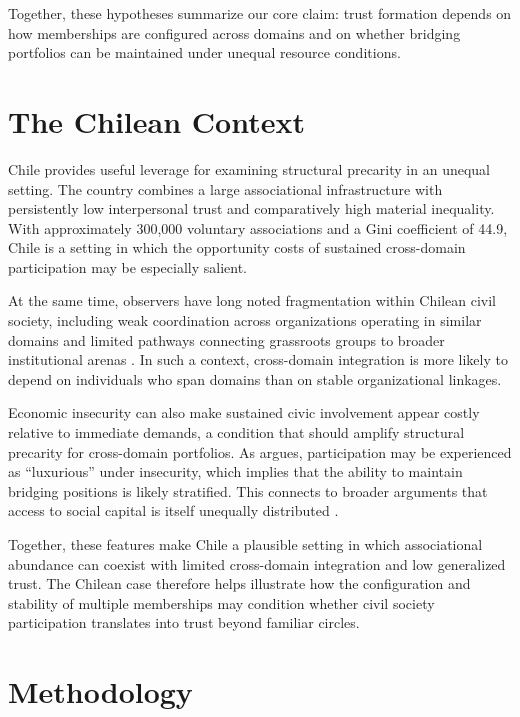 Together, these hypotheses summarize our core claim: trust formation depends on how memberships are configured across domains and on whether bridging portfolios can be maintained under unequal resource conditions.

\section{The Chilean Context}

Chile provides useful leverage for examining structural precarity in an unequal setting. The country combines a large associational infrastructure with persistently low interpersonal trust and comparatively high material inequality. With approximately 300{,}000 voluntary associations \parencite{irarrazaval_chile_2017} and a Gini coefficient of 44.9, Chile is a setting in which the opportunity costs of sustained cross-domain participation may be especially salient.

At the same time, observers have long noted fragmentation within Chilean civil society, including weak coordination across organizations operating in similar domains and limited pathways connecting grassroots groups to broader institutional arenas \parencite{programa_de_las_naciones_unidas_para_el_desarrollo_desarrollo_2000}. In such a context, cross-domain integration is more likely to depend on individuals who span domains than on stable organizational linkages.

Economic insecurity can also make sustained civic involvement appear costly relative to immediate demands, a condition that should amplify structural precarity for cross-domain portfolios. As \textcite{oxhorn_neopluralism_2004} argues, participation may be experienced as ``luxurious'' under insecurity, which implies that the ability to maintain bridging positions is likely stratified. This connects to broader arguments that access to social capital is itself unequally distributed \parencite{portes_social_1998}.

Together, these features make Chile a plausible setting in which associational abundance can coexist with limited cross-domain integration and low generalized trust. The Chilean case therefore helps illustrate how the configuration and stability of multiple memberships may condition whether civil society participation translates into trust beyond familiar circles.


\section{Methodology}

